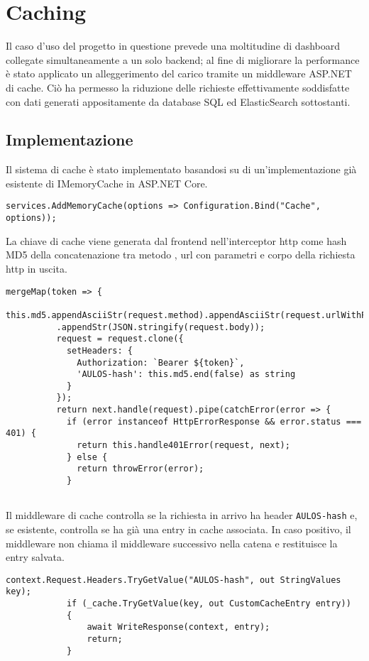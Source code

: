 \section{Caching}
\label{ch:caching}
Il caso d'uso del progetto in questione prevede una moltitudine di dashboard collegate simultaneamente a un solo backend; al fine di  migliorare la performance è stato applicato un alleggerimento del carico tramite un middleware ASP.NET di cache. Ciò ha permesso la riduzione delle richieste effettivamente soddisfatte con dati generati appositamente da database SQL ed ElasticSearch sottostanti.
\subsection{Implementazione}
Il sistema di cache è stato implementato basandosi su di un'implementazione già esistente di IMemoryCache in ASP.NET Core. \cite{MemCache}
\begin{lstlisting}[caption={Startup.cs, Memory Cache Injection}, style=javaScriptCode]
services.AddMemoryCache(options => Configuration.Bind("Cache", options));
\end{lstlisting}

La chiave di cache viene generata dal frontend nell'interceptor http come hash MD5 \cite{MD5} della concatenazione tra metodo \cite{HTTPMETHODS}, url con parametri \cite{HTTPPARAMS} e corpo \cite{HTTPBODY} della richiesta http in uscita.
\begin{lstlisting}[caption={Http Interceptor, line 28}, style=javaScriptCode]
mergeMap(token => {
          this.md5.appendAsciiStr(request.method).appendAsciiStr(request.urlWithParams)
          .appendStr(JSON.stringify(request.body));
          request = request.clone({
            setHeaders: {
              Authorization: `Bearer ${token}`,
              'AULOS-hash': this.md5.end(false) as string
            }
          });
          return next.handle(request).pipe(catchError(error => {
            if (error instanceof HttpErrorResponse && error.status === 401) {
              return this.handle401Error(request, next);
            } else {
              return throwError(error);
            }
          
\end{lstlisting}

Il middleware di cache controlla se la richiesta in arrivo ha header \verb|AULOS-hash| e, se esistente, controlla se ha già una entry in cache associata. In caso positivo, il middleware non chiama il middleware successivo nella catena e restituisce la entry salvata.
\begin{lstlisting}[caption={TotallyOriginalCachingMiddleware.cs, Cache hit scenario}, style=javaScriptCode]
context.Request.Headers.TryGetValue("AULOS-hash", out StringValues key);
            if (_cache.TryGetValue(key, out CustomCacheEntry entry))
            {
                await WriteResponse(context, entry);
                return;
            }
\end{lstlisting}

